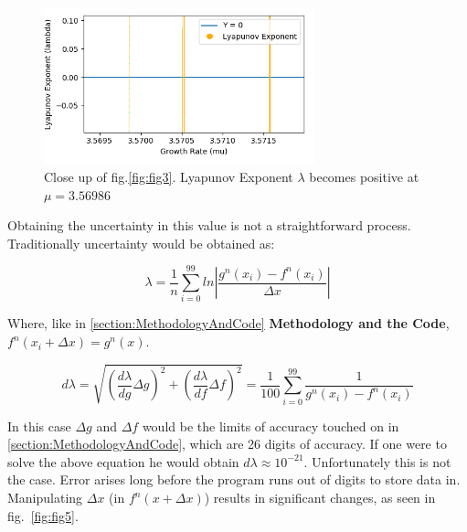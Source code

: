 \newpage
\begin{figure}[h]
    \centering
    \includegraphics[width=0.7\textwidth]{Images/Lyapunov 3.3.1.png}
    \caption{Close up of fig.\ref{fig:fig3}. Lyapunov Exponent $\lambda$ becomes positive at $\mu = 3.56986$}
    \label{fig:fig4}
\end{figure}


Obtaining the uncertainty in this value is not
a straightforward process. Traditionally uncertainty would be obtained as:


\begin{equation}
    \label{eq:2.7}
    \lambda = \frac{1}{n} \sum_{i=0}^{99} ln\left| \frac{g^n (x_i) - f^n (x_i)}{\Delta x} \right|
\end{equation}

Where, like in \ref{section:MethodologyAndCode} \textbf{Methodology and the Code}, $f^n (x_i+\Delta x) = g^n (x)$.

\begin{equation}
    \label{eq:2.8}
    d\lambda = \sqrt{ \left( \frac{d\lambda}{dg} \Delta g \right)^2 +\left(\frac{d\lambda}{df} \Delta f \right)^2} =
    \frac{1}{100} \sum_{i=0}^{99} \frac{1}{g^n (x_i) - f^n (x_i)}
\end{equation}

In this case $\Delta g$ and $\Delta f$ would be the limits of accuracy touched on in \ref{section:MethodologyAndCode},
which are 26 digits of accuracy. If one were to solve the above equation he would obtain $d\lambda \approx 10^{-21}$.
Unfortunately this is not the case. Error arises long before the program runs out of digits to store data in.
Manipulating $\Delta x$ (in $f^n (x+\Delta x)$) results in significant changes, as seen in fig.~\ref{fig:fig5}. 

